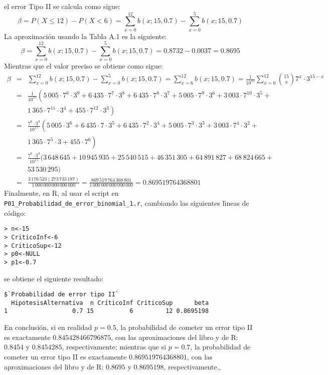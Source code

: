 \begin{solucion}
\begin{enumerate}
  el error Tipo II se calcula como sigue:
  \begin{equation*}
   \beta = P(X \leq 12) - P(X< 6) = \sum_{x=0}^{12} b(x;15,0.7) - \sum_{x=0}^{5} b(x;15,0.7)
  \end{equation*}
  La aproximaci\'on usando la Tabla A.1 es la siguiente:
  \begin{equation*}
   \beta = \sum_{x=0}^{12} b(x;15,0.7) - \sum_{x=0}^{5} b(x;15,0.7) = 0.8732 - 0.0037 = 0.8695
  \end{equation*}
  Mientras que el valor preciso se obtiene como sigue:
  \begin{eqnarray*}
   \beta & = & \sum_{x=0}^{12} b(x;15,0.7) - \sum_{x=0}^{5} b(x;15,0.7) = \sum_{x=6}^{12} b(x;15,0.7) = \frac{1}{10^{15}} \sum_{x=6}^{12} \binom{15}{x} 7^{x}\cdot 3^{15-x} \\
   & = & \frac{1}{10^{15}} \left( 5\,005\cdot 7^6\cdot3^9 + 6\,435\cdot 7^7 \cdot 3^8 + 6\,435\cdot 7^8 \cdot 3^7 + 5\,005\cdot 7^9\cdot 3^6  + 3\,003\cdot7^{10}\cdot 3^5 + \right. \\
   & & \left. 1\,365\cdot 7^{11}\cdot 3^4 + 455\cdot 7^{12}\cdot 3^3 \right) \\
   & = & \frac{7^6 \cdot 3^3}{10^{15}}\left( 5\,005\cdot 3^6 + 6\,435\cdot 7 \cdot 3^5 + 6\,435\cdot 7^2\cdot 3^4 + 5\,005\cdot 7^3\cdot 3^3  + 3\,003\cdot7^4 \cdot 3^2 + \right. \\
   & & \left. 1\,365\cdot 7^5\cdot 3 + 455\cdot 7^6 \right) \\
   & = & \frac{7^6\cdot 3^3}{10^{15}}(3\,648\,645 + 10\,945\,935 + 25\,540\,515 + 46\,351\,305 + 64\,891\,827 + 68\,824\,665 + \\
   & & 53\,530\,295) \\
   & = & \frac{3\,176\,523(273\,733\,187)}{1\,000\,000\,000\,000\,000} = \frac{869\,519\,764\,368\,801}{1\,000\,000\,000\,000\,000} = 0.869519764368801
  \end{eqnarray*}
  Finalmente, en R, al usar el script en \texttt{P01\_Probabilidad\_de\_error\_binomial\_1.r}, cambiando las siguientes l\'{\i}neas de c\'odigo:
  \begin{verbatim}
> n<-15
> CriticoInf<-6
> CriticoSup<-12
> p0<-NULL
> p1<-0.7
  \end{verbatim}
  \vspace{-0.5cm}
  se obtiene el siguiente resultado:
  \begin{verbatim}
$`Probabilidad de error tipo II`
  HipotesisAlternativa  n CríticoInf CriticoSup      beta
1                  0.7 15          6         12 0.8695198
  \end{verbatim}
  \vspace{-0.5cm}
  En conclusi\'on, si en realidad $p=0.5$, la probabilidad de cometer un error tipo II es exactamente $0.845428466796875$, con las aproximaciones del libro y de R: $0.8454$ y $0.8454285$, respectivamente; mientras que si $p=0.7$, la probabilidad de cometer un error tipo II es exactamente $0.869519764368801$, con las aproximaciones del libro y de R: $0.8695$ y $0.8695198$, respectivamente.${}_{\square}$
  

\end{enumerate}
\end{solucion}
